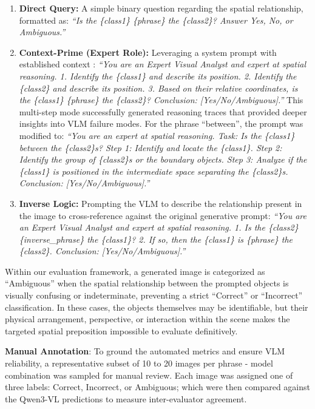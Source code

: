 \begin{enumerate}
    \item \textbf{Direct Query:} A simple binary question regarding the spatial relationship, formatted as: \textit{``Is the \{class1\} \{phrase\} the \{class2\}? Answer Yes, No, or Ambiguous.''}

    \item \textbf{Context-Prime (Expert Role):} Leveraging a system prompt with established context \citep{zhang2024multimodalchainofthoughtreasoninglanguage}: \textit{``You are an Expert Visual Analyst and expert at spatial reasoning. 1. Identify the \{class1\} and describe its position. 2. Identify the \{class2\} and describe its position. 3. Based on their relative coordinates, is the \{class1\} \{phrase\} the \{class2\}? Conclusion: [Yes/No/Ambiguous].''} This multi-step mode successfully generated reasoning traces that provided deeper insights into VLM failure modes. For the phrase ``between'', the prompt was modified to: \textit{``You are an expert at spatial reasoning. Task: Is the \{class1\} between the \{class2\}s? Step 1: Identify and locate the \{class1\}. Step 2: Identify the group of \{class2\}s or the boundary objects. Step 3: Analyze if the \{class1\} is positioned in the intermediate space separating the \{class2\}s. Conclusion: [Yes/No/Ambiguous].''}

    \item \textbf{Inverse Logic:} Prompting the VLM to describe the relationship present in the image to cross-reference against the original generative prompt: \textit{``You are an Expert Visual Analyst and expert at spatial reasoning. 1. Is the \{class2\} \{inverse\_phrase\} the \{class1\}? 2. If so, then the \{class1\} is \{phrase\} the \{class2\}. Conclusion: [Yes/No/Ambiguous].''}
\end{enumerate}

Within our evaluation framework, a generated image is categorized as ``Ambiguous'' when the spatial relationship between the prompted objects is visually confusing or indeterminate, preventing a strict ``Correct'' or ``Incorrect'' classification. In these cases, the objects themselves may be identifiable, but their physical arrangement, perspective, or interaction within the scene makes the targeted spatial preposition impossible to evaluate definitively. 

\textbf{Manual Annotation}: To ground the automated metrics and ensure VLM reliability, a representative subset of 10 to 20 images per phrase - model combination was sampled for manual review. Each image was assigned one of three labels: Correct, Incorrect, or Ambiguous; which were then compared against the Qwen3-VL predictions to measure inter-evaluator agreement.


